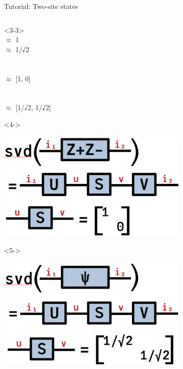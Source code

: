 \begin{frame}[fragile]{Tutorial: Two-site states}
\begin{columns}
\begin{column}{5cm}
\begin{onlyenv}<3-3>
~\\
$\approx$ 1 \\
$\approx$ 1/√2 \\
~\\
~\\
$\approx$ [1, 0] \\
~\\
~\\
$\approx$ [1/√2, 1/√2]
\end{onlyenv}

\begin{onlyenv}<4->
\vspace*{0.0cm}
\begin{center}
\includegraphics[width=0.7\textwidth]{
  slides/assets/svd_ZpZm12.png
}
\end{center}
\end{onlyenv}

\begin{onlyenv}<5->
~\\
\begin{center}
\includegraphics[width=0.7\textwidth]{
  slides/assets/svd_cat12.png
}
\end{center}
\vspace*{0.0cm}
\end{onlyenv}

\end{column}

\end{columns}

\end{frame}
